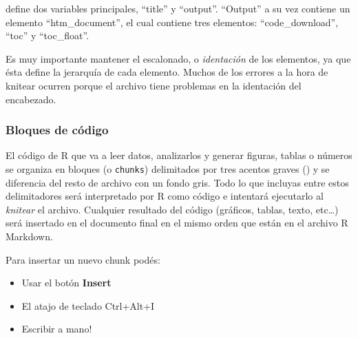\documentclass[
  letterpaper,
  DIV=11,
  numbers=noendperiod]{scrartcl}
\providecommand{\tightlist}{%
  \setlength{\itemsep}{0pt}\setlength{\parskip}{0pt}}\usepackage{longtable,booktabs,array}
\begin{document}
define dos variables principales, ``title'' y ``output''. ``Output'' a
su vez contiene un elemento ``htm\_document'', el cual contiene tres
elementos: ``code\_download'', ``toc'' y ``toc\_float''.

\begin{tcolorbox}[enhanced jigsaw, arc=.35mm, title=\textcolor{quarto-callout-important-color}{\faExclamation}\hspace{0.5em}{Importante}, coltitle=black, bottomrule=.15mm, breakable, colbacktitle=quarto-callout-important-color!10!white, bottomtitle=1mm, opacityback=0, toptitle=1mm, left=2mm, opacitybacktitle=0.6, rightrule=.15mm, toprule=.15mm, colback=white, colframe=quarto-callout-important-color-frame, leftrule=.75mm, titlerule=0mm]
Es muy importante mantener el escalonado, o \emph{identación} de los
elementos, ya que ésta define la jerarquía de cada elemento. Muchos de
los errores a la hora de knitear ocurren porque el archivo tiene
problemas en la identación del encabezado.
\end{tcolorbox}

\hypertarget{bloques-de-cuxf3digo}{%
\subsubsection{Bloques de código}\label{bloques-de-cuxf3digo}}

El código de R que va a leer datos, analizarlos y generar figuras,
tablas o números se organiza en bloques (o \texttt{chunks}) delimitados
por tres acentos graves
(\texttt{\textasciigrave{}\textasciigrave{}\textasciigrave{}}) y se
diferencia del resto de archivo con un fondo gris. Todo lo que incluyas
entre estos delimitadores será interpretado por R como código e
intentará ejecutarlo al \emph{knitear} el archivo. Cualquier resultado
del código (gráficos, tablas, texto, etc\ldots) será insertado en el
documento final en el mismo orden que están en el archivo R Markdown.

\begin{tcolorbox}[enhanced jigsaw, arc=.35mm, title=\textcolor{quarto-callout-note-color}{\faInfo}\hspace{0.5em}{Instrucciones}, coltitle=black, bottomrule=.15mm, breakable, colbacktitle=quarto-callout-note-color!10!white, bottomtitle=1mm, opacityback=0, toptitle=1mm, left=2mm, opacitybacktitle=0.6, rightrule=.15mm, toprule=.15mm, colback=white, colframe=quarto-callout-note-color-frame, leftrule=.75mm, titlerule=0mm]

Para insertar un nuevo chunk podés:

\begin{itemize}
\tightlist
\item
  Usar el botón \textbf{Insert}
\item
  El atajo de teclado Ctrl+Alt+I
\item
  Escribir a mano!
\end{itemize}

\end{tcolorbox}
\end{document}
